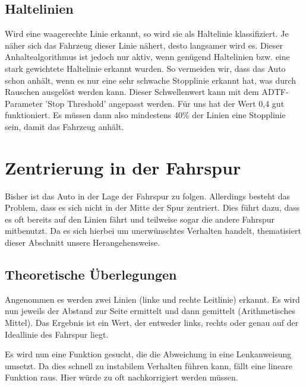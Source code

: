 \documentclass[a4paper,12pt]{report}
\begin{document}

\subsection{Haltelinien}

	Wird eine waagerechte Linie erkannt, so wird sie als Haltelinie klassifiziert.
	Je näher sich das Fahrzeug dieser Linie nähert, desto langsamer wird es.
	Dieser Anhaltealgorithmus ist jedoch nur aktiv, wenn genügend Haltelinien bzw. eine stark gewichtete Haltelinie erkannt wurden.
	So vermeiden wir, dass das Auto schon anhält, wenn es nur eine sehr schwache Stopplinie erkannt hat, was durch Rauschen ausgelöst werden kann.
	Dieser Schwellenwert kann mit dem ADTF-Parameter 'Stop Threshold' angepasst werden.
	Für uns hat der Wert 0,4 gut funktioniert.
	Es müssen dann also mindestens 40\% der Linien eine Stopplinie sein, damit das Fahrzeug anhält. %

\section{Zentrierung in der Fahrspur}

	Bisher ist das Auto in der Lage der Fahrspur zu folgen.
	Allerdings besteht das Problem, dass es sich nicht in der Mitte der Spur zentriert.
	Dies führt dazu, dass es oft bereits auf den Linien fährt und teilweise sogar die andere Fahrspur mitbenutzt.
	Da es sich hierbei um unerwünschtes Verhalten handelt, thematisiert dieser Abschnitt unsere Herangehensweise.

\subsection{Theoretische Überlegungen}

	Angenommen es werden zwei Linien (linke und rechte Leitlinie) erkannt.
	Es wird nun jeweils der Abstand zur Seite ermittelt und dann gemittelt (Arithmetisches Mittel).
	Das Ergebnis ist ein Wert, der entweder links, rechts oder genau auf der Ideallinie des Fahrspur liegt.

	Es wird nun eine Funktion gesucht, die die Abweichung in eine Lenkanweisung umsetzt.
	Da dies schnell zu instabilem Verhalten führen kann, fällt eine lineare Funktion raus.
	Hier würde zu oft nachkorrigiert werden müssen.
\end{document}
